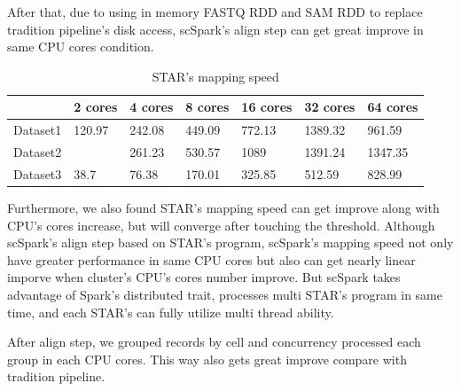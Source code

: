 \documentclass[conference]{IEEEtran}
\begin{document}
After that, due to using in memory FASTQ RDD and SAM RDD to replace tradition pipeline's disk access, scSpark's align step can get great improve in same CPU cores condition.
\begin{table}
	\centering
	\caption{STAR's mapping speed}\label{tab3}
	\resizebox{0.45\textwidth}{!} {
	\begin{tabular}{l | l | l | l | l | l | l}
		\hline
		 & 2 cores & 4 cores & 8 cores & 16 cores & 32 cores & 64 cores \\
		\hline
		Dataset1 & 120.97 & 242.08 & 449.09 & 772.13 & 1389.32 & 961.59 \\
		Dataset2 &  & 261.23 & 530.57 & 1089 & 1391.24 & 1347.35 \\
		Dataset3 & 38.7 & 76.38 & 170.01 & 325.85 & 512.59 & 828.99 \\
		\hline
	\end{tabular} }
\end{table}
Furthermore, we also found STAR's mapping speed can get improve along with CPU's cores increase, but will converge after touching the threshold.
Although scSpark's align step based on STAR's program, scSpark's mapping speed not only have greater performance in same CPU cores but also can get nearly linear imporve when cluster's CPU's cores number improve.
But scSpark takes advantage of Spark's distributed trait, processes multi STAR's program in same time, and each STAR's can fully utilize multi thread ability.

After align step, we grouped records by cell and concurrency processed each group in each CPU cores.
This way also gets great improve compare with tradition pipeline.
\end{document}
